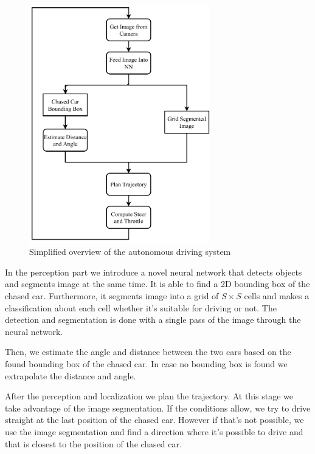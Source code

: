 \begin{figure}[h!]
    \centering
    \includegraphics[width=0.7\textwidth]{images/bachelor_diagram4.pdf}
    \caption{Simplified overview of the autonomous driving system}\label{f:overview}
\end{figure}


In the perception part we introduce a novel neural network that detects objects and segments image at the same time. It is able to find a 2D bounding box of the chased car. Furthermore, it segments image into a grid of $S\times S$ cells and makes a classification about each cell whether it's suitable for driving or not. The detection and segmentation is done with a single pass of the image through the neural network. \par

Then, we estimate the angle and distance between the two cars based on the found bounding box of the chased car. In case no bounding box is found we extrapolate the distance and angle. \par

After the perception and localization we plan the trajectory. At this stage we take advantage of the image segmentation. If the conditions allow, we try to drive straight at the last position of the chased car. However if that's not possible, we use the image segmentation and find a direction where it's possible to drive and that is closest to the position of the chased car. \par

